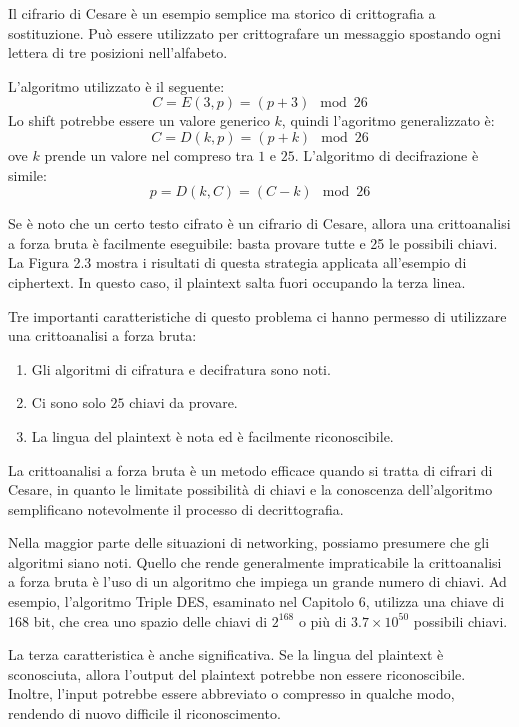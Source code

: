 Il cifrario di Cesare è un esempio semplice ma storico di crittografia a
sostituzione. Può essere utilizzato per crittografare un messaggio
spostando ogni lettera di tre posizioni nell'alfabeto.

L'algoritmo utilizzato è il seguente:
\[
C = E(3, p) = (p + 3)\mod 26  
\]
Lo shift potrebbe essere un valore generico $k$, quindi l'agoritmo generalizzato 
è:
\[
C = D(k, p) = (p + k)\mod 26  
\]
ove $k$ prende un valore nel compreso tra $1$ e $25$. L'algoritmo di 
decifrazione è simile:
\[
  p = D(k, C) = (C - k)\mod 26  
\]

Se è noto che un certo testo cifrato è un cifrario di Cesare, allora 
una crittoanalisi a forza bruta è facilmente eseguibile: basta provare
tutte e 25 le possibili chiavi. La Figura 2.3 mostra i risultati di
questa strategia applicata all'esempio di ciphertext. In questo caso,
il plaintext salta fuori occupando la terza linea.

Tre importanti caratteristiche di questo problema ci hanno permesso
di utilizzare una crittoanalisi a forza bruta:
\begin{enumerate}
    \item Gli algoritmi di cifratura e decifratura sono noti.
    \item Ci sono solo $25$ chiavi da provare.
    \item La lingua del plaintext è nota ed è facilmente riconoscibile.
\end{enumerate}

La crittoanalisi a forza bruta è un metodo efficace quando si tratta
di cifrari di Cesare, in quanto le limitate possibilità di chiavi e
la conoscenza dell'algoritmo semplificano notevolmente il processo
di decrittografia.

Nella maggior parte delle situazioni di networking, possiamo presumere
che gli algoritmi siano noti. Quello che rende generalmente impraticabile
la crittoanalisi a forza bruta è l'uso di un algoritmo che impiega un
grande numero di chiavi. Ad esempio, l'algoritmo Triple DES, esaminato
nel Capitolo 6, utilizza una chiave di 168 bit, che crea uno spazio
delle chiavi di $2^{168}$ o più di $3.7 \times 10^{50}$ possibili
chiavi.

La terza caratteristica è anche significativa. Se la lingua del
plaintext è sconosciuta, allora l'output del plaintext potrebbe non
essere riconoscibile. Inoltre, l'input potrebbe essere abbreviato o
compresso in qualche modo, rendendo di nuovo difficile il riconoscimento.
